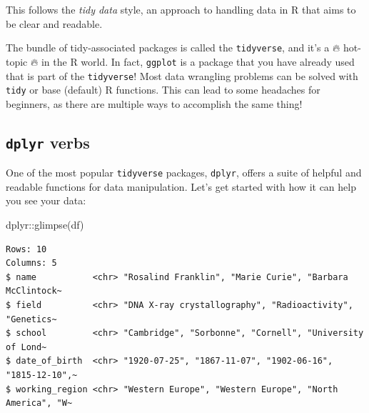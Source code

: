 \documentclass[
  letterpaper,
  DIV=11,
  numbers=noendperiod]{scrreprt}
\newenvironment{Shaded}{\begin{snugshade}}{\end{snugshade}}
\newcommand{\FunctionTok}[1]{\textcolor[rgb]{0.28,0.35,0.67}{#1}}
\newcommand{\NormalTok}[1]{\textcolor[rgb]{0.00,0.23,0.31}{#1}}
\newcommand{\SpecialCharTok}[1]{\textcolor[rgb]{0.37,0.37,0.37}{#1}}
\begin{document}
This follows the \emph{tidy data} style, an approach to handling data in
R that aims to be clear and readable.

\begin{tcolorbox}[enhanced jigsaw, bottomtitle=1mm, bottomrule=.15mm, toprule=.15mm, opacityback=0, leftrule=.75mm, breakable, colback=white, toptitle=1mm, left=2mm, coltitle=black, titlerule=0mm, opacitybacktitle=0.6, title=\textcolor{quarto-callout-note-color}{\faInfo}\hspace{0.5em}{Tidiest Universe}, rightrule=.15mm, arc=.35mm, colframe=quarto-callout-note-color-frame, colbacktitle=quarto-callout-note-color!10!white]

The bundle of tidy-associated packages is called the \texttt{tidyverse},
and it's a 🔥 hot-topic 🔥 in the R world. In fact, \texttt{ggplot} is a
package that you have already used that is part of the
\texttt{tidyverse}! Most data wrangling problems can be solved with
\texttt{tidy} or base (default) R functions. This can lead to some
headaches for beginners, as there are multiple ways to accomplish the
same thing!

\end{tcolorbox}

\subsection{\texorpdfstring{\texttt{dplyr}
verbs}{dplyr verbs}}\label{dplyr-verbs}

One of the most popular \texttt{tidyverse} packages, \texttt{dplyr},
offers a suite of helpful and readable functions for data manipulation.
Let's get started with how it can help you see your data:

\begin{Shaded}
\begin{Highlighting}[]
\NormalTok{dplyr}\SpecialCharTok{::}\FunctionTok{glimpse}\NormalTok{(df)}
\end{Highlighting}
\end{Shaded}

\begin{verbatim}
Rows: 10
Columns: 5
$ name           <chr> "Rosalind Franklin", "Marie Curie", "Barbara McClintock~
$ field          <chr> "DNA X-ray crystallography", "Radioactivity", "Genetics~
$ school         <chr> "Cambridge", "Sorbonne", "Cornell", "University of Lond~
$ date_of_birth  <chr> "1920-07-25", "1867-11-07", "1902-06-16", "1815-12-10",~
$ working_region <chr> "Western Europe", "Western Europe", "North America", "W~
\end{verbatim}
\end{document}
